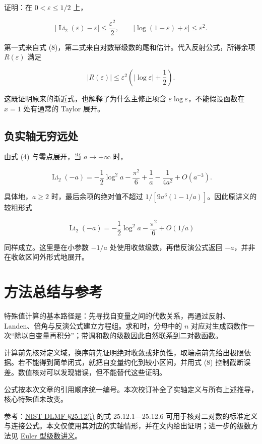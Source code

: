 \documentclass[11pt,a4paper]{article}
\begin{document}
证明：在 \(0<\varepsilon\leqslant1/2\) 上，

\[
|\operatorname{Li}_2(\varepsilon)-\varepsilon|\leqslant\frac{\varepsilon^2}{2},
\qquad
|\log(1-\varepsilon)+\varepsilon|\leqslant\varepsilon^2.
\]

第一式来自式 (8)，第二式来自对数幂级数的尾和估计。代入反射公式，所得余项 \(R(\varepsilon)\) 满足

\[
|R(\varepsilon)|\leqslant\varepsilon^2\left(|\log\varepsilon|+\frac12\right).
\]

这既证明原来的渐近式，也解释了为什么主修正项含 \(\varepsilon\log\varepsilon\)，不能假设函数在 \(x=1\) 处有通常的 Taylor 展开。

\hypertarget{ux8d1fux5b9eux8f74ux65e0ux7a77ux8fdcux5904}{%
\subsection{负实轴无穷远处}\label{ux8d1fux5b9eux8f74ux65e0ux7a77ux8fdcux5904}}

由式 (4) 与零点展开，当 \(a\to+\infty\) 时，

\[
\operatorname{Li}_2(-a)
=-\frac12\log^2a-\frac{\pi^2}{6}
+\frac1a-\frac1{4a^2}+O(a^{-3}).
\]

具体地，\(a\geqslant2\) 时，最后余项的绝对值不超过 \(1/[9a^3(1-1/a)]\)。因此原讲义的较粗形式

\[
\operatorname{Li}_2(-a)=-\frac12\log^2a-\frac{\pi^2}{6}+O(1/a)
\]

同样成立。这里是在小参数 \(-1/a\) 处使用收敛级数，再借反演公式返回 \(-a\)，并非在收敛区间外形式地展开。

\hypertarget{ux65b9ux6cd5ux603bux7ed3ux4e0eux53c2ux8003}{%
\section{方法总结与参考}\label{ux65b9ux6cd5ux603bux7ed3ux4e0eux53c2ux8003}}

特殊值计算的基本路径是：先寻找自变量之间的代数关系，再通过反射、Landen、倍角与反演公式建立方程组。求和时，分母中的 \(n\) 对应对生成函数作一次``除以自变量再积分''；带调和数的级数因此自然联系到二对数函数。

计算前先核对定义域，换序前先证明绝对收敛或非负性，取端点前先给出极限依据。若不能得到简单闭式，就把自变量约化到较小区间，并用式 (8) 控制截断误差。数值核对可以发现错误，但不能替代这些证明。

公式按本次文章的引用顺序统一编号。本次校订补全了实轴定义与所有上述推导，核心特殊值未改变。

参考：\href{https://dlmf.nist.gov/25.12\#i}{NIST DLMF §25.12(i)} 的式 25.12.1---25.12.6 可用于核对二对数的标准定义与连接公式。本文仅使用其对应的实轴情形，并在文内给出证明；进一步的级数方法见 \href{https://vincent-arqain.github.io/math-notes/notes/890e1516e64e21a2fb2248b4/}{Euler 型级数讲义}。
\end{document}
